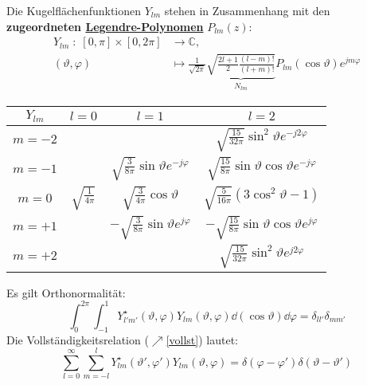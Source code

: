 			   Die Kugelflächenfunktionen $Y_{lm}$ stehen in Zusammenhang mit den \textbf{zugeordneten \href{https://de.wikipedia.org/wiki/Legendre-Polynom}{Legendre-Polynomen}} $P_{lm}(z)$:
			        \begin{equation}\begin{split}
					        Y_{lm}\; :\; [0,\pi] \times [0,2\pi] &\to \mathbb{C}, \\ (\vartheta,\varphi) &\mapsto \frac{1}{\sqrt{2\pi}} \underbrace{\sqrt{\frac{2l+1}{2}\frac{(l-m)!}{(l+m)!}}}_{N_{lm}} P_{lm}(\cos\vartheta) e^{jm\varphi}
				        \end{split}\end{equation}
		  \begin{center}
			  \begin{tabular}{c|c|c|c}
				  $Y_{lm}$ & $l=0$                   & $l=1$                                               & $l=2$                                                              \\
				  \hline
				  $m=-2$   &                         &                                                     & $\sqrt{\frac{15}{32\pi}} \sin^2\vartheta e^{-j2\varphi}$           \\
				  $m=-1$   &                         & $\sqrt{\frac{3}{8\pi}} \sin\vartheta e^{-j\varphi}$ & $\sqrt{\frac{15}{8\pi}} \sin\vartheta\cos\vartheta e^{-j\varphi}$  \\
				  $m=0$    & $\sqrt{\frac{1}{4\pi}}$ & $\sqrt{\frac{3}{4\pi}} \cos\vartheta$               & $ \sqrt{\frac{5}{16\pi}} (3\cos^2\vartheta -1)$                    \\
				  $m=+1$   &                         & $-\sqrt{\frac{3}{8\pi}} \sin\vartheta e^{j\varphi}$ & $- \sqrt{\frac{15}{8\pi}} \sin\vartheta\cos\vartheta e^{j\varphi}$ \\
				  $m=+2$   &                         &                                                     & $\sqrt{\frac{15}{32\pi}} \sin^2\vartheta e^{j2\varphi}$
			  \end{tabular}
		  \end{center}
		   Es gilt Orthonormalität:
		  \begin{equation}
		  	\int_0^{2\pi}\int_{-1}^1  Y_{l'm'}^\star(\vartheta,\varphi) Y_{lm}(\vartheta,\varphi)\dd(\cos\vartheta)\dd\varphi = \delta_{ll'}\delta_{mm'} 		  \end{equation}		  
		   Die Vollständigkeitsrelation ($\nearrow$\ref{vollst}) lautet:
		  \begin{equation}
\sum_{l=0}^{\infty}\sum_{m=-l}^l  Y_{lm}^\star(\vartheta',\varphi') Y_{lm}(\vartheta,\varphi) = \delta(\varphi-\varphi')\delta(\vartheta-\vartheta')
		  \end{equation}
